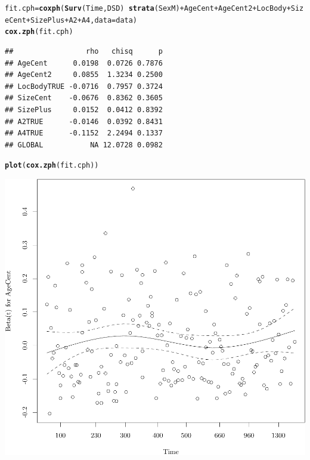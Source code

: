 \documentclass{article}\usepackage[]{graphicx}\usepackage[]{color}
\makeatletter
\def\maxwidth{ %
  \ifdim\Gin@nat@width>\linewidth
    \linewidth
  \else
    \Gin@nat@width
  \fi
}
\newcommand{\hlopt}[1]{\textcolor[rgb]{0,0,0}{#1}}%
\newcommand{\hlstd}[1]{\textcolor[rgb]{0.345,0.345,0.345}{#1}}%
\newcommand{\hlkwb}[1]{\textcolor[rgb]{0.69,0.353,0.396}{#1}}%
\newcommand{\hlkwc}[1]{\textcolor[rgb]{0.333,0.667,0.333}{#1}}%
\newcommand{\hlkwd}[1]{\textcolor[rgb]{0.737,0.353,0.396}{\textbf{#1}}}%
\newenvironment{kframe}{%
 \def\at@end@of@kframe{}%
 \ifinner\ifhmode%
  \def\at@end@of@kframe{\end{minipage}}%
  \begin{minipage}{\columnwidth}%
 \fi\fi%
 \def\FrameCommand##1{\hskip\@totalleftmargin \hskip-\fboxsep
 \colorbox{shadecolor}{##1}\hskip-\fboxsep
     \hskip-\linewidth \hskip-\@totalleftmargin \hskip\columnwidth}%
 \MakeFramed {\advance\hsize-\width
   \@totalleftmargin\z@ \linewidth\hsize
   \@setminipage}}%
 {\par\unskip\endMakeFramed%
 \at@end@of@kframe}
\newenvironment{knitrout}{}{} %
\makeatother
\begin{document}
\begin{knitrout}
\color{fgcolor}\begin{kframe}
\begin{alltt}
\hlstd{fit.cph} \hlkwb{=} \hlkwd{coxph}\hlstd{(}\hlkwd{Surv}\hlstd{(Time, DSD)} \hlopt{~} \hlkwd{strata}\hlstd{(SexM)} \hlopt{+} \hlstd{AgeCent} \hlopt{+} \hlstd{AgeCent2} \hlopt{+} \hlstd{LocBody} \hlopt{+} \hlstd{SizeCent} \hlopt{+} \hlstd{SizePlus} \hlopt{+} \hlstd{A2} \hlopt{+} \hlstd{A4,} \hlkwc{data} \hlstd{= data)}
\hlkwd{cox.zph}\hlstd{(fit.cph)}
\end{alltt}
\begin{verbatim}
##                 rho   chisq      p
## AgeCent      0.0198  0.0726 0.7876
## AgeCent2     0.0855  1.3234 0.2500
## LocBodyTRUE -0.0716  0.7957 0.3724
## SizeCent    -0.0676  0.8362 0.3605
## SizePlus     0.0152  0.0412 0.8392
## A2TRUE      -0.0146  0.0392 0.8431
## A4TRUE      -0.1152  2.2494 0.1337
## GLOBAL           NA 12.0728 0.0982
\end{verbatim}
\begin{alltt}
\hlkwd{plot}\hlstd{(}\hlkwd{cox.zph}\hlstd{(fit.cph))}
\end{alltt}
\end{kframe}

{\centering \includegraphics[width=\maxwidth]{figure/05-eda-ph-check-full-3-1} 

}





\end{knitrout}
\end{document}
